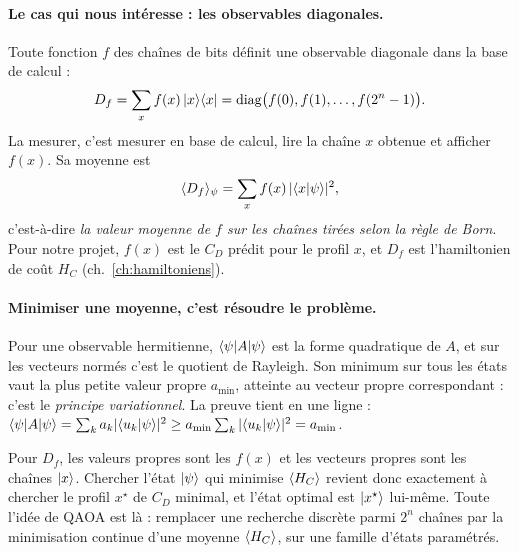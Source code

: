 \paragraph{Le cas qui nous intéresse : les observables diagonales.} Toute fonction $f$ des chaînes de bits définit une observable diagonale dans la base de calcul :
\[
D_f=\sum_xf(x)\,\lvert x\rangle\langle x\rvert=\mathrm{diag}\big(f(0),f(1),\dots,f(2^n-1)\big).
\]
La mesurer, c'est mesurer en base de calcul, lire la chaîne $x$ obtenue et afficher $f(x)$. Sa moyenne est
\[
\langle D_f\rangle_\psi=\sum_xf(x)\,|\langle x\vert \psi\rangle|^2,
\]
c'est-à-dire \emph{la valeur moyenne de $f$ sur les chaînes tirées selon la règle de Born}. Pour notre projet, $f(x)$ est le $C_D$ prédit pour le profil $x$, et $D_f$ est l'hamiltonien de coût $H_C$ (ch.~\ref{ch:hamiltoniens}).

\paragraph{Minimiser une moyenne, c'est résoudre le problème.} Pour une observable hermitienne, $\langle \psi\rvert A\lvert \psi\rangle$ est la forme quadratique de $A$, et sur les vecteurs normés c'est le quotient de Rayleigh. Son minimum sur tous les états vaut la plus petite valeur propre $a_{\min}$, atteinte au vecteur propre correspondant : c'est le \emph{principe variationnel}. La preuve tient en une ligne : $\langle \psi\rvert A\lvert \psi\rangle=\sum_ka_k|\langle u_k\vert \psi\rangle|^2\ge a_{\min}\sum_k|\langle u_k\vert \psi\rangle|^2=a_{\min}$.

Pour $D_f$, les valeurs propres sont les $f(x)$ et les vecteurs propres sont les chaînes $\lvert x\rangle$. Chercher l'état $\lvert \psi\rangle$ qui minimise $\langle H_C\rangle$ revient donc exactement à chercher le profil $x^\star$ de $C_D$ minimal, et l'état optimal est $\lvert x^\star\rangle$ lui-même. Toute l'idée de QAOA est là : remplacer une recherche discrète parmi $2^n$ chaînes par la minimisation continue d'une moyenne $\langle H_C\rangle$, sur une famille d'états paramétrés.


